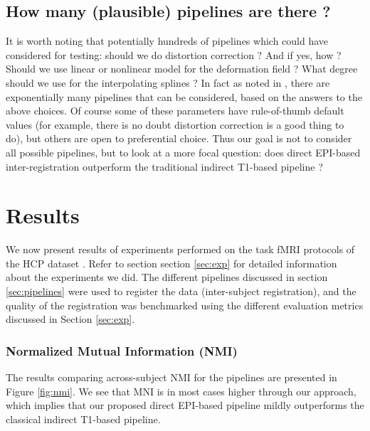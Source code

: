\subsection{How many (plausible) pipelines are there ?}
It is worth noting that potentially hundreds of pipelines which could
have considered for testing: should we do distortion correction ? And
if yes, how ? Should we use linear or nonlinear model for the
deformation field ?
%
What degree should we use for the interpolating splines ? In fact as
noted in \cite{Poldrack059188}, there are exponentially many pipelines
that can be considered, based on the answers to the above choices.
%
Of course some of these parameters have rule-of-thumb default values
(for example, there is no doubt distortion correction is a good thing
to do), but others are open to preferential choice. Thus our goal is
not to consider all possible pipelines, but to look at a more focal
question: does direct EPI-based inter-registration outperform the
traditional indirect T1-based pipeline ?


\section{Results}
\label{sec:results}
We now present results of experiments performed on the task fMRI
protocols of the HCP dataset \cite{VanEssen20122222}. Refer to
section section \ref{sec:exp} for detailed information about the
experiments we did. The different pipelines discussed in section
\ref{sec:pipelines} were used to register the data (inter-subject
registration), and the quality of the registration was benchmarked
using the different evaluation metrics discussed in Section \ref{sec:exp}. 

\subsubsection{Normalized Mutual Information (NMI)}
The results comparing across-subject NMI for the pipelines are presented in Figure \ref{fig:nmi}. We see that MNI is in most cases higher through our approach, which implies that 
our proposed direct EPI-based pipeline mildly outperforms the classical indirect T1-based pipeline.

